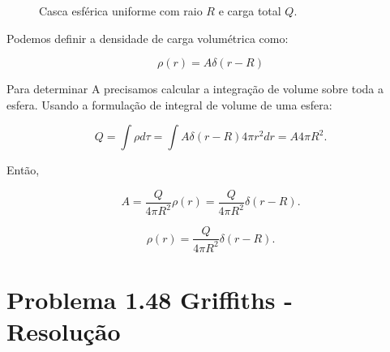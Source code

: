 \documentclass[a4paper,12pt]{article}
\begin{document}
\begin{enumerate}
\begin{figure}[!h]
\begin{center}
    \end{center}
    \caption{Casca esférica uniforme com raio $R$ e carga total $Q$.}
    \end{figure}

    Podemos definir a densidade de carga volumétrica como:

    \begin{equation}
        \rho(r)=A \delta(r-R)
    \end{equation}

    Para determinar A precisamos calcular a integra\c{c}\~ao de volume sobre toda a esfera. 
    Usando a formulação de integral de volume de uma esfera:

    \begin{equation}
        Q=\int \rho d \tau=\int A \delta(r-R) 4 \pi r^{2} d r=A 4 \pi R^{2}.
    \end{equation}

    Ent\~ao,

    \begin{equation}
        A=\frac{Q}{4 \pi R^{2}} \rho(r)=\frac{Q}{4 \pi R^{2}} \delta(r-R) .
    \end{equation}

    \begin{equation}
        \boxed{
        \rho(r)=\frac{Q}{4 \pi R^{2}} \delta(r-R) .
        }
    \end{equation}

\end{enumerate}

\section*{Problema 1.48 Griffiths - Resolu\c{c}\~ao}
\end{document}
